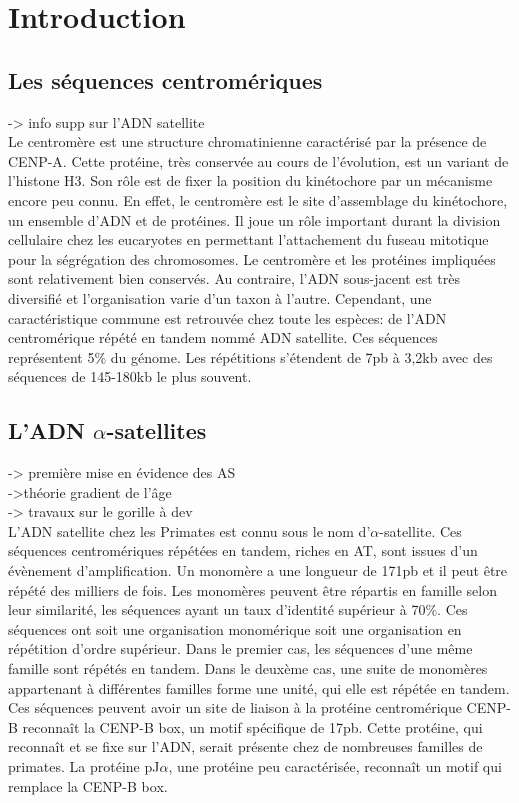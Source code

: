 \documentclass[12pt,a4paper]{article}
\begin{document}
\section{Introduction}
\subsection{Les séquences centromériques}
-> info supp sur l'ADN satellite\\

Le centromère est une structure chromatinienne caractérisé par la présence de CENP-A. Cette protéine, très conservée au cours de l'évolution, est un variant de l'histone H3. Son rôle est de fixer la position du kinétochore par un mécanisme encore peu connu. En effet, le centromère est le site d'assemblage du kinétochore, un ensemble d'ADN et de protéines. Il joue un rôle important durant la division cellulaire chez les eucaryotes en permettant l'attachement du fuseau mitotique pour la ségrégation des chromosomes. Le centromère et les protéines impliquées sont relativement bien conservés. Au contraire, l'ADN sous-jacent est très diversifié et l'organisation varie d'un taxon à l'autre. Cependant, une caractéristique commune est retrouvée chez toute les espèces: de l'ADN centromérique répété en tandem nommé ADN satellite. Ces séquences représentent 5\% du génome. Les répétitions s'étendent de 7pb à 3,2kb avec des séquences de 145-180kb le plus souvent.  

\subsection{L'ADN $\alpha$-satellites}
-> première mise en évidence des AS\\
->théorie gradient de l'âge\\
-> travaux sur le gorille à dev\\

L'ADN satellite chez les Primates est connu sous le nom d'$\alpha$-satellite. Ces séquences centromériques répétées en tandem, riches en AT, sont issues d'un évènement d'amplification. Un monomère a une longueur de 171pb et il peut être répété des milliers de fois. Les monomères peuvent être répartis en famille selon leur similarité, les séquences ayant un taux d'identité supérieur à 70\%. Ces séquences ont soit une organisation monomérique soit une organisation en répétition d'ordre supérieur. Dans le premier cas, les séquences d'une même famille sont répétés en tandem. Dans le deuxème cas, une suite de monomères appartenant à différentes familles forme une unité, qui elle est répétée en tandem. Ces séquences peuvent avoir un site de liaison à la protéine centromérique CENP-B reconnaît la CENP-B box, un motif spécifique de 17pb. Cette protéine, qui reconnaît et se fixe sur l'ADN, serait présente chez de nombreuses familles de primates. La protéine pJ$\alpha$, une protéine peu caractérisée, reconnaît un motif qui remplace la CENP-B box.
\end{document}
